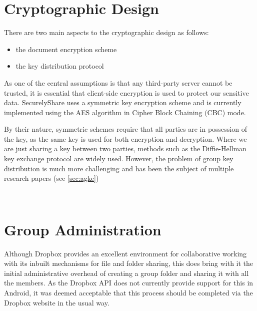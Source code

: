 \section{Cryptographic Design}
\label{sec:crypto}

There are two main aspects to the cryptographic design as follows:
\begin{itemize}
\item the document encryption scheme
\item the key distribution protocol
\end{itemize} 

As one of the central assumptions is that any third-party server cannot be trusted, it is essential that client-side encryption is used to protect our sensitive data.  SecurelyShare uses a symmetric key encryption scheme and is currently implemented using the AES algorithm in Cipher Block Chaining (CBC) mode.

By their nature, symmetric  schemes require that all parties are in possession of the key, as the same key is used for both encryption and decryption.  Where we are just sharing a key between two parties, methods such as the Diffie-Hellman key exchange protocol \cite{dh1976}  are widely used.  However, the problem of group key distribution is much more challenging and has been the subject of multiple research papers (see  \ref{sec:agke})





\\




\section{Group Administration}

Although Dropbox provides an excellent environment for collaborative working with its inbuilt mechanisms for file and folder sharing, this does bring with it the initial administrative overhead of creating a group folder and sharing it with all the members.  As the Dropbox API does not currently provide support for  this in Android, it was deemed acceptable that this process should be completed via the Dropbox website in the usual way.  

